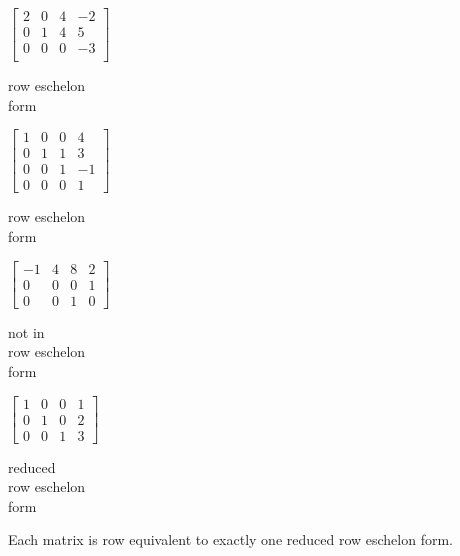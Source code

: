 \documentclass[letterpaper,12pt,fleqn]{article}
\begin{document}
\begin{example}
  \begin{minipage}[t]{2in}
    \begin{center}
      $\begin{bmatrix}
        2 & 0 & 4 & -2 \\
        0 & 1 & 4 & 5 \\
        0 & 0 & 0 & -3 \\
      \end{bmatrix}$

      \bigskip

      row eschelon \\
      form
    \end{center}
  \end{minipage}
  \begin{minipage}[t]{2in}
    \begin{center}
      $\begin{bmatrix}
        1 & 0 & 0 & 4 \\
        0 & 1 & 1 & 3 \\
        0 & 0 & 1 & -1 \\
        0 & 0 & 0 & 1
      \end{bmatrix}$

      \bigskip

      row eschelon \\
      form
    \end{center}
  \end{minipage}

  \begin{minipage}[t]{2in}
    \begin{center}
      $\begin{bmatrix}
        -1 & 4 & 8 & 2 \\
        0 & 0 & 0 & 1 \\
        0 & 0 & 1 & 0
      \end{bmatrix}$

      \bigskip

      not in \\
      row eschelon \\
      form
    \end{center}
  \end{minipage}
  \begin{minipage}[t]{2in}
    \begin{center}
      $\begin{bmatrix}
        1 & 0 & 0 & 1 \\
        0 & 1 & 0 & 2 \\
        0 & 0 & 1 & 3
      \end{bmatrix}$

      \bigskip

      reduced \\
      row eschelon \\
      form
    \end{center}
  \end{minipage}
\end{example}

\begin{theorem}
  Each matrix is row equivalent to exactly one reduced row eschelon form.
\end{theorem}
\end{document}
